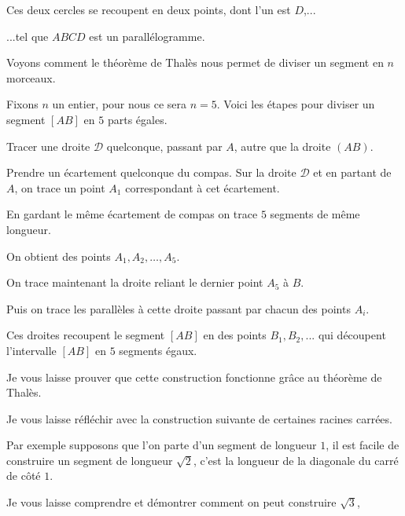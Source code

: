 \change
Ces deux cercles se recoupent en deux points, dont l'un est $D$,...

\change
...tel que $ABCD$ est un parallélogramme.


\diapo


Voyons comment le théorème de Thalès nous permet de diviser un segment en 
$n$ morceaux.

Fixons $n$ un entier, pour nous ce sera $n=5$.
Voici les étapes pour diviser un segment $[AB]$ en $5$ parts égales.

\change
Tracer une droite $\mathcal{D}$ quelconque, passant par $A$, autre que la droite $(AB)$.
  
\change
Prendre un écartement quelconque du compas. Sur la droite $\mathcal{D}$ et en partant de $A$,
on trace un point $A_1$ correspondant à cet écartement.

\change
En gardant le même écartement de compas on trace $5$ segments de même longueur.

\change

\change

\change

\change

 On obtient des points $A_1,A_2,\ldots,A_5$.
 
\change 
On trace maintenant la droite reliant le dernier point $A_5$ à $B$.

\change
Puis on trace les parallèles à cette droite passant par chacun des points $A_i$.

\change

\change

\change

\change

\change
  Ces droites recoupent le segment $[AB]$ en des points $B_1,B_2,...$ qui découpent l'intervalle
  $[AB]$ en $5$ segments égaux.
  
Je vous laisse prouver que cette construction fonctionne grâce au théorème de Thalès.


\diapo

Je vous laisse réfléchir avec la construction suivante de certaines racines carrées.

Par exemple supposons que l'on parte d'un segment de longueur $1$,
il est facile de construire un segment de longueur $\sqrt2$,
c'est la longueur de la diagonale du carré de côté $1$.

\change
Je vous laisse comprendre et démontrer comment on peut construire $\sqrt3$,

